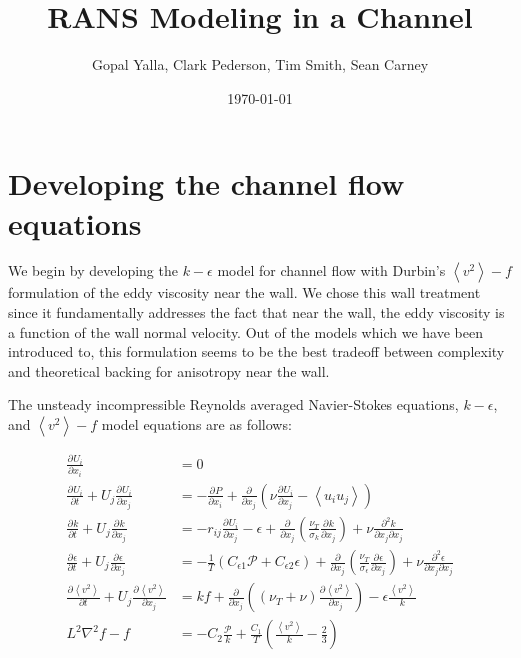 \documentclass[a4paper,11pt]{article}
\title{\vspace{-4ex}RANS Modeling in a Channel}
\author{Gopal Yalla, Clark Pederson, Tim Smith, Sean Carney}
\date{\today}
\newcommand{\chevron}[1]{\left\langle #1 \right\rangle}
\newcommand{\pderiv}[3][]{%
  \ensuremath{\frac{\partial^{#1} {#2}}{\partial {#3}^{#1}}}}
\begin{document}
\maketitle
\section{Developing the channel flow equations}

We begin by developing the $k-\epsilon$ model for channel flow with Durbin's
$\chevron{v^2}-f$ formulation of the eddy viscosity near
the wall. We chose this wall treatment since it fundamentally
addresses the fact that near the wall, the eddy viscosity is a function of the
wall normal velocity. Out of the models which we have been introduced to, this
formulation seems to be the best tradeoff between complexity and theoretical
backing for anisotropy near the wall.    

The unsteady incompressible Reynolds averaged Navier-Stokes equations, 
$k-\epsilon$, and $\chevron{v^2}-f$ model equations are as follows:

\begin{align}
\pderiv{U_i}{x_i} &= 0 \label{eq:continuity} \\
\pderiv{U_i}{t} + U_j\pderiv{U_i}{x_j} &= -\pderiv{P}{x_i} +
\pderiv{}{x_j}\left(\nu\pderiv{U_i}{x_j} - \chevron{u_i u_j}\right) \\
\pderiv{k}{t} + U_j\pderiv{k}{x_j} &= -r_{ij}\pderiv{U_i}{x_j} - \epsilon +
\pderiv{}{x_j}\left(\frac{\nu_T}{\sigma_k}\pderiv{k}{x_j}\right) +
\nu\frac{\partial^2 k}{\partial x_j \partial x_j} \\
\pderiv{\epsilon}{t} + U_j\pderiv{\epsilon}{x_j} &=
-\frac{1}{T}\left(C_{\epsilon 1} \mathcal{P} + C_{\epsilon 2} \epsilon\right) +
\pderiv{}{x_j}\left(\frac{\nu_T}{\sigma_\epsilon}\pderiv{\epsilon}{x_j}\right) +
\nu\frac{\partial^2 \epsilon}{\partial x_j \partial x_j} \\
\pderiv{\chevron{v^2}}{t} + U_j\pderiv{\chevron{v^2}}{x_j} &= kf +
\pderiv{}{x_j}\left((\nu_T+\nu)\pderiv{\chevron{v^2}}{x_j}\right) - \epsilon
\frac{\chevron{v^2}}{k} \\
L^2 \nabla^2 f - f &= -C_2 \frac{\mathcal{P}}{k} + \frac{C_1}{T} \left(
\frac{\chevron{v^2}}{k} - \frac{2}{3} \right) 
\label{eq:redistribution}
\end{align}
\end{document}
